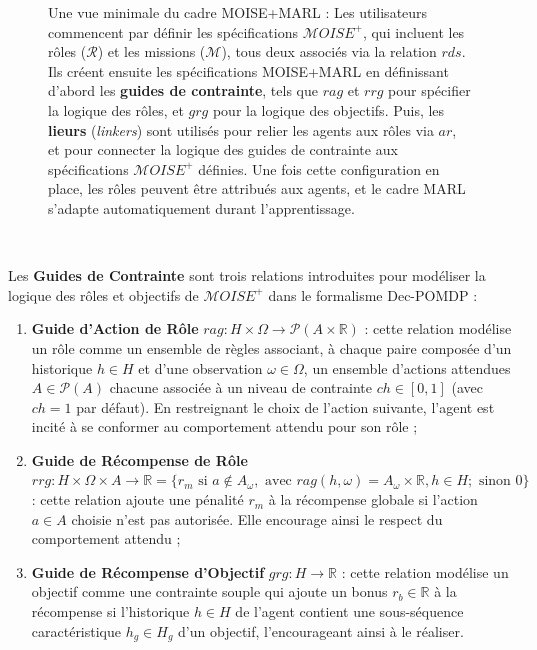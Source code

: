 \begin{figure}[h!]
    \centering
    
    \caption{Une vue minimale du cadre MOISE+MARL :
        Les utilisateurs commencent par définir les spécifications $\mathcal{M}OISE^+$, qui incluent les rôles ($\mathcal{R}$) et les missions ($\mathcal{M}$), tous deux associés via la relation $rds$.  
        Ils créent ensuite les spécifications MOISE+MARL en définissant d'abord les \textbf{guides de contrainte}, tels que $rag$ et $rrg$ pour spécifier la logique des rôles, et $grg$ pour la logique des objectifs.  
        Puis, les \textbf{lieurs} (\textit{linkers}) sont utilisés pour relier les agents aux rôles via $ar$, et pour connecter la logique des guides de contrainte aux spécifications $\mathcal{M}OISE^+$ définies.  
        Une fois cette configuration en place, les rôles peuvent être attribués aux agents, et le cadre MARL s'adapte automatiquement durant l'apprentissage.}
    \label{fig:mm_synthesis}
\end{figure}

\

\noindent Les \textbf{Guides de Contrainte} sont trois relations introduites pour modéliser la logique des rôles et objectifs de $\mathcal{M}OISE^+$ dans le formalisme Dec-POMDP :

\begin{enumerate}[label={\roman*) },itemjoin={; \quad}]
    \item \textbf{Guide d'Action de Rôle} \quad $rag: H \times \Omega \rightarrow \mathcal{P}(A \times \mathbb{R})$ : cette relation modélise un rôle comme un ensemble de règles associant, à chaque paire composée d'un historique $h \in H$ et d'une observation $\omega \in \Omega$, un ensemble d'actions attendues $A \in \mathcal{P}(A)$ chacune associée à un niveau de contrainte $ch \in [0,1]$ (avec $ch = 1$ par défaut). En restreignant le choix de l'action suivante, l'agent est incité à se conformer au comportement attendu pour son rôle ;
    
    \item \textbf{Guide de Récompense de Rôle} \quad $rrg: H \times \Omega \times A \to \mathbb{R} = \{r_m \text{ si } a \notin A_\omega, \text{ avec } rag(h, \omega) = A_\omega \times \mathbb{R}, h \in H; \text{ sinon } 0\}$ : cette relation ajoute une pénalité $r_m$ à la récompense globale si l'action $a \in A$ choisie n'est pas autorisée. Elle encourage ainsi le respect du comportement attendu ;
    
    \item \textbf{Guide de Récompense d'Objectif} \quad $grg: H \rightarrow \mathbb{R}$ : cette relation modélise un objectif comme une contrainte souple qui ajoute un bonus $r_b \in \mathbb{R}$ à la récompense si l'historique $h \in H$ de l'agent contient une sous-séquence caractéristique $h_g \in H_g$ d'un objectif, l'encourageant ainsi à le réaliser.
\end{enumerate}

